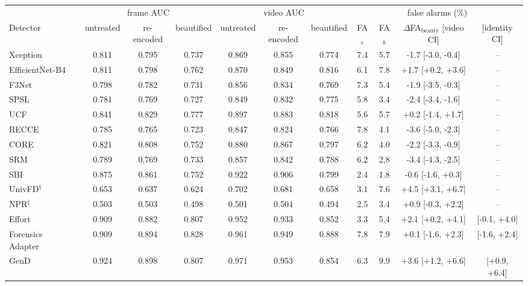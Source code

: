 \begin{tabular}{@{}l ccc ccc cccc@{}}
\toprule
 & \multicolumn{3}{c}{frame AUC} & \multicolumn{3}{c}{video AUC} & \multicolumn{4}{c}{false alarms (\%)} \\
\cmidrule(lr){2-4}\cmidrule(lr){5-7}\cmidrule(lr){8-11}
Detector & untreated & re-encoded & beautified & untreated & re-encoded & beautified & FA$_c$ & FA$_b$ & $\Delta$FA$_\text{beauty}$ [video CI] & [identity CI] \\
\midrule
Xception~\cite{xception} & 0.811 & 0.795 & 0.737 & 0.869 & 0.855 & 0.774 & 7.4 & 5.7 & -1.7 [-3.0, -0.4] & -- \\
EfficientNet-B4~\cite{efficientnet} & 0.811 & 0.798 & 0.762 & 0.870 & 0.849 & 0.816 & 6.1 & 7.8 & +1.7 [+0.2, +3.6] & -- \\
F3Net~\cite{f3net} & 0.798 & 0.782 & 0.731 & 0.856 & 0.834 & 0.769 & 7.3 & 5.4 & -1.9 [-3.5, -0.3] & -- \\
SPSL~\cite{spsl} & 0.781 & 0.769 & 0.727 & 0.849 & 0.832 & 0.775 & 5.8 & 3.4 & -2.4 [-3.4, -1.6] & -- \\
UCF~\cite{ucf} & 0.841 & 0.829 & 0.777 & 0.897 & 0.883 & 0.818 & 5.6 & 5.7 & +0.2 [-1.4, +1.7] & -- \\
RECCE~\cite{recce} & 0.785 & 0.765 & 0.723 & 0.847 & 0.824 & 0.766 & 7.8 & 4.1 & -3.6 [-5.0, -2.3] & -- \\
CORE~\cite{core} & 0.821 & 0.808 & 0.752 & 0.880 & 0.867 & 0.797 & 6.2 & 4.0 & -2.2 [-3.3, -0.9] & -- \\
SRM~\cite{srm} & 0.789 & 0.769 & 0.733 & 0.857 & 0.842 & 0.788 & 6.2 & 2.8 & -3.4 [-4.3, -2.5] & -- \\
SBI~\cite{sbi} & 0.875 & 0.861 & 0.752 & 0.922 & 0.906 & 0.799 & 2.4 & 1.8 & -0.6 [-1.6, +0.3] & -- \\
UnivFD$^\ddagger$~\cite{univfd} & 0.653 & 0.637 & 0.624 & 0.702 & 0.681 & 0.658 & 3.1 & 7.6 & +4.5 [+3.1, +6.7] & -- \\
NPR$^\ddagger$~\cite{npr} & 0.503 & 0.503 & 0.498 & 0.501 & 0.504 & 0.494 & 2.5 & 3.4 & +0.9 [-0.3, +2.2] & -- \\
Effort~\cite{effort} & 0.909 & 0.882 & 0.807 & 0.952 & 0.933 & 0.852 & 3.3 & 5.4 & +2.1 [+0.2, +4.1] & [-0.1, +4.0] \\
Forensics Adapter~\cite{forensicsadapter} & 0.909 & 0.894 & 0.828 & 0.961 & 0.949 & 0.888 & 7.8 & 7.9 & +0.1 [-1.6, +2.3] & [-1.6, +2.4] \\
GenD~\cite{gend2026} & 0.924 & 0.898 & 0.807 & 0.971 & 0.953 & 0.854 & 6.3 & 9.9 & +3.6 [+1.2, +6.6] & [+0.9, +6.4] \\

\end{tabular}
